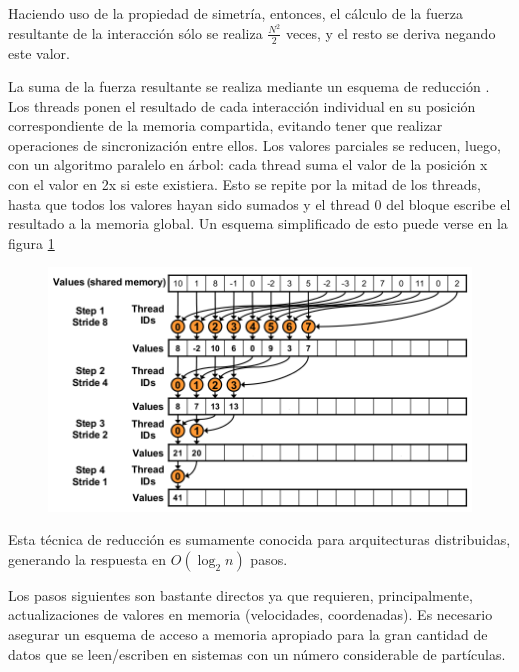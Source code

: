 Haciendo uso de la propiedad de simetría, entonces, el cálculo de la fuerza resultante de la interacción sólo se realiza $\frac{N^2}{2}$ veces, y el resto se deriva negando este valor.


La suma de la fuerza resultante se realiza mediante un esquema de reducción \cite{cudaReductions}. Los threads ponen el resultado de cada interacción individual en su posición correspondiente de la memoria compartida,
evitando tener que realizar operaciones de sincronización entre ellos. Los valores parciales se reducen, luego, con un algoritmo paralelo en árbol: cada thread suma el valor de la posición x con el valor en 2x si este existiera. Esto se repite por la mitad de los threads, hasta que todos los valores hayan sido sumados 
y el thread 0 del bloque escribe el resultado a la memoria global.
Un esquema simplificado de esto puede verse en la figura \ref{reduction}
\begin{figure}[htbp]
   \centering
   \includegraphics[width=\plotwidth]{img/md/reductions.png}
   \caption{}
   \label{reduction}
\end{figure}

Esta técnica de reducción es sumamente conocida para arquitecturas distribuidas, generando la respuesta en $O(\log_2{n})$ pasos.

Los pasos siguientes son bastante directos ya que requieren, principalmente, actualizaciones de valores en memoria (velocidades, coordenadas). 
Es necesario asegurar un esquema de acceso a memoria apropiado para la gran cantidad de datos que se leen/escriben en sistemas con un número considerable de partículas.  

